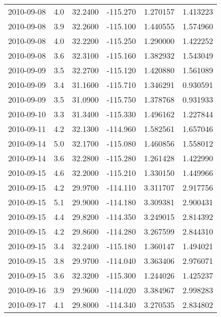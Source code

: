 \begin{tabular}{lrrrrr}
2010-09-08 &       4.0 &  32.2400 &  -115.270 &         1.270157 &         1.413223 \\
2010-09-08 &       3.9 &  32.2600 &  -115.100 &         1.440555 &         1.574960 \\
2010-09-08 &       4.0 &  32.2200 &  -115.250 &         1.290000 &         1.422252 \\
2010-09-08 &       3.6 &  32.3100 &  -115.160 &         1.382932 &         1.543049 \\
2010-09-09 &       3.5 &  32.2700 &  -115.120 &         1.420880 &         1.561089 \\
2010-09-09 &       3.4 &  31.1600 &  -115.710 &         1.346291 &         0.930591 \\
2010-09-09 &       3.5 &  31.0900 &  -115.750 &         1.378768 &         0.931933 \\
2010-09-10 &       3.3 &  31.3400 &  -115.330 &         1.496162 &         1.227844 \\
2010-09-11 &       4.2 &  32.1300 &  -114.960 &         1.582561 &         1.657046 \\
2010-09-14 &       5.0 &  32.1700 &  -115.080 &         1.460856 &         1.558012 \\
2010-09-14 &       3.6 &  32.2800 &  -115.280 &         1.261428 &         1.422990 \\
2010-09-15 &       4.6 &  32.2000 &  -115.210 &         1.330150 &         1.449966 \\
2010-09-15 &       4.2 &  29.9700 &  -114.110 &         3.311707 &         2.917756 \\
2010-09-15 &       5.1 &  29.9000 &  -114.180 &         3.309381 &         2.900431 \\
2010-09-15 &       4.4 &  29.8200 &  -114.350 &         3.249015 &         2.814392 \\
2010-09-15 &       4.2 &  29.8600 &  -114.280 &         3.267599 &         2.844310 \\
2010-09-15 &       3.4 &  32.2400 &  -115.180 &         1.360147 &         1.494021 \\
2010-09-15 &       3.8 &  29.9700 &  -114.040 &         3.363406 &         2.976071 \\
2010-09-15 &       3.6 &  32.3200 &  -115.300 &         1.244026 &         1.425237 \\
2010-09-16 &       3.9 &  29.9600 &  -114.020 &         3.384967 &         2.998283 \\
2010-09-17 &       4.1 &  29.8000 &  -114.340 &         3.270535 &         2.834802 \\

\end{tabular}
